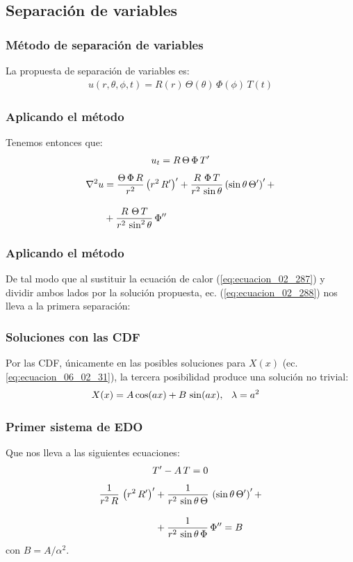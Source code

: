 \documentclass[12pt]{beamer}
\begin{document}
\subsection{Separación de variables}
\begin{frame}
\frametitle{Método de separación de variables}
La propuesta de separación de variables es:
\begin{align}
u (r, \theta, \phi, t) = R (r) \, \Theta (\theta) \, \Phi(\phi) \, T (t)
\label{eq:ecuacion_02_288}
\end{align}
\end{frame}
\begin{frame}
\frametitle{Aplicando el método}
Tenemos entonces que:
\begin{align}
u_{t} = R \, \Theta \, \Phi \, {T}^{\prime} \label{eq:ecuacion_02_289}
\end{align}
\begin{align}
\begin{aligned}
\laplacian{u} &= \dfrac{\Theta \, \Phi \, R}{r^{2}} \left( r^{2} \, \pderivada{R} \right)^{\prime} + \dfrac{R \, \, \Phi \, T}{r^{2} \, \sin \theta} \left( \sin \theta \, \pderivada{\Theta} \right)^{\prime} + \\[1em]
&+ \dfrac{R \, \, \Theta \, T}{r^{2} \, \sin^{2} \theta} \, \sderivada{\Phi}
\end{aligned}
\label{eq:ecuacion_02_290}
\end{align}
\end{frame}
\begin{frame}
\frametitle{Aplicando el método}
De tal modo que al sustituir la ecuación de calor (\ref{eq:ecuacion_02_287}) y dividir ambos lados por la solución propuesta, ec. (\ref{eq:ecuacion_02_288}) nos lleva a la primera separación:
\end{frame}
\begin{frame}
\frametitle{Soluciones con las CDF}
Por las CDF, únicamente en las posibles soluciones para $X(x)$ (ec. \ref{eq:ecuacion_06_02_31}), la tercera posibilidad produce una solución no trivial:
\pause
\begin{align*}
X (x) = A \cos (a x ) + B \, \sin (a x), & \hspace{0.2cm} \lambda = a^{2}
\end{align*}
\end{frame}
\begin{frame}
\frametitle{Primer sistema de EDO}
Que nos lleva a las siguientes ecuaciones:
\begin{align}
{T}^{\prime} - A \, T = 0
\label{eq:ecuacion_02_292}
\end{align}
\begin{align}
\begin{aligned}
\dfrac{1}{r^{2} \, R} \, \left( r^{2} \, {R}^{\prime} \right)^{\prime} &+ \dfrac{1}{r^{2} \, \sin \theta \, \Theta} \, \left( \sin \theta \, {\Theta}^{\prime} \right)^{\prime} + \\[1em]
&+ \dfrac{1}{r^{2} \, \sin \theta \, \Phi} \, {\Phi}^{\prime \prime} = B
\end{aligned}
\label{eq:ecuacion_02_293}
\end{align}
con $B = A / \alpha^{2}$.
\end{frame}
\end{document}
